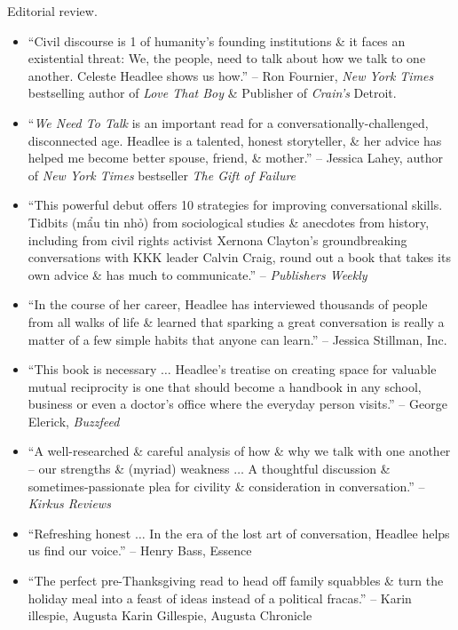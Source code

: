 \documentclass{article}
\begin{document}
\begin{enumerate}
	{\sf Editorial review.}
	\begin{itemize}
		\item ``Civil discourse is 1 of humanity's founding institutions \& it faces an existential threat: We, the people, need to talk about how we talk to one another. {\sc Celeste Headlee} shows us how.'' -- {\sc Ron Fournier}, {\it New York Times} bestselling author of {\it Love That Boy} \& Publisher of {\it Crain's} Detroit.
		\item ``{\it We Need To Talk} is an important read for a conversationally-challenged, disconnected age. {\sc Headlee} is a talented, honest storyteller, \& her advice has helped me become better spouse, friend, \& mother.'' -- {\sc Jessica Lahey}, author of {\it New York Times} bestseller {\it The Gift of Failure}
		\item ``This powerful debut offers 10 strategies for improving conversational skills. Tidbits (mẩu tin nhỏ) from sociological studies \& anecdotes from history, including from civil rights activist {\sc Xernona Clayton}'s groundbreaking conversations with KKK leader {\sc Calvin Craig}, round out a book that takes its own advice \& has much to communicate.'' -- {\it Publishers Weekly}
		\item ``In the course of her career, {\sc Headlee} has interviewed thousands of people from all walks of life \& learned that sparking a great conversation is really a matter of a few simple habits that anyone can learn.'' -- {\sc Jessica Stillman}, Inc.
		\item ``This book is necessary $\ldots$ {\sc Headlee}'s treatise on creating space for valuable mutual reciprocity is one that should become a handbook in any school, business or even a doctor's office where the everyday person visits.'' -- {\sc George Elerick}, {\it Buzzfeed}
		\item ``A well-researched \& careful analysis of how \& why we talk with one another -- our strengths \& (myriad) weakness $\ldots$ A thoughtful discussion \& sometimes-passionate plea for civility \& consideration in conversation.'' -- {\it Kirkus Reviews}
		\item ``Refreshing honest $\ldots$ In the era of the lost art of conversation, {\sc Headlee} helps us find our voice.'' -- {\sc Henry Bass}, Essence
		\item ``The perfect pre-Thanksgiving read to head off family squabbles \& turn the holiday meal into a feast of ideas instead of a political fracas.'' -- {\sc Karin illespie, Augusta Karin Gillespie, Augusta Chronicle}
	\end{itemize}


\end{enumerate}
\end{document}
